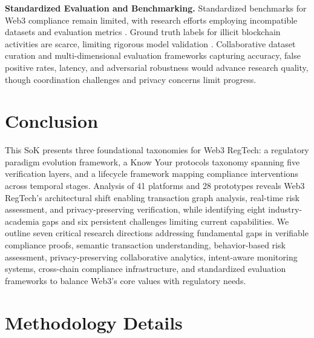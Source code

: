\documentclass[conference,compsoc]{IEEEtran}
\begin{document}
\noindent\textbf{Standardized Evaluation and Benchmarking.}
Standardized benchmarks for Web3 compliance remain limited, with research efforts employing incompatible datasets and evaluation metrics \cite{huda2025amlnet}. Ground truth labels for illicit blockchain activities are scarce, limiting rigorous model validation \cite{sankaewtong2025sokadvances}. Collaborative dataset curation and multi-dimensional evaluation frameworks capturing accuracy, false positive rates, latency, and adversarial robustness would advance research quality, though coordination challenges and privacy concerns limit progress.



\section{Conclusion}
\label{sec:conclusion}

This SoK presents three foundational taxonomies for Web3 RegTech: a regulatory paradigm evolution framework, a Know Your protocols taxonomy spanning five verification layers, and a lifecycle framework mapping compliance interventions across temporal stages.
Analysis of 41 platforms and 28 prototypes reveals Web3 RegTech's architectural shift enabling transaction graph analysis, real-time risk assessment, and privacy-preserving verification, while identifying eight industry-academia gaps and six persistent challenges limiting current capabilities.
We outline seven critical research directions addressing fundamental gaps in verifiable compliance proofs, semantic transaction understanding, behavior-based risk assessment, privacy-preserving collaborative analytics, intent-aware monitoring systems, cross-chain compliance infrastructure, and standardized evaluation frameworks to balance Web3's core values with regulatory needs.






\appendix

\section*{Methodology Details}
\label{appendix:methodology}
\end{document}
